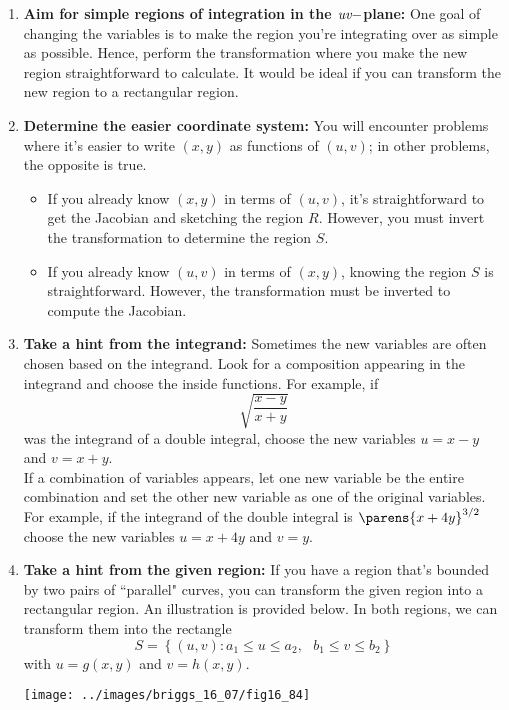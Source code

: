 \documentclass[../mathNotesPreamble]{subfiles}
\begin{document}
\begin{enumerate}
\item\textbf{Aim for simple regions of integration in the $\emph{uv}-$plane:} One goal of changing the variables is to make the region you're integrating over as simple as possible. Hence, perform the transformation where  you make the new region straightforward to calculate. It would be ideal if you can transform the new region to a rectangular region.

\item\textbf{Determine the easier coordinate system:} You will encounter problems where it's easier to write $(x,y)$ as functions of $(u,v)$; in other problems, the opposite is true. 
\begin{itemize}
\item If you already know $(x,y)$ in terms of $(u,v)$, it's straightforward to get the Jacobian and sketching the region $R$. However, you must invert the transformation to determine the region $S$.

\item  If you already know $(u,v)$ in terms of $(x,y)$, knowing the region $S$ is straightforward. However, the transformation must be inverted to compute the Jacobian.
\end{itemize} 
\item\textbf{Take a hint from the integrand:} Sometimes the new variables are often chosen based on the integrand. Look for a composition appearing in the integrand and choose the inside functions. For example, if
\[
\sqrt{\dfrac{x-y}{x+y}}
\]
was the integrand of a double integral, choose the new variables $u=x-y$ and $v=x+y$.\\

If a combination of variables appears, let one new variable be the entire combination and set the other new variable as one of the original variables. For example, if the integrand of the double integral is $
\parens{x+4y}^{3/2}$
choose the new variables $u=x+4y$ and $v=y$.

\item\textbf{Take a hint from the given  region:} If you have a region that's bounded by two pairs of ``parallel" curves, you can transform the given region into a rectangular region. An illustration is provided below. In both regions, we can  transform them into the rectangle 
\[
S=\left\{(u,v):a_1\leq u\leq a_2,\text{ }b_1\leq v\leq b_2\right\}
\]
with $u=g(x,y)$ and $v=h(x,y).$
\begin{center}
\texttt{[image: ../images/briggs\_16\_07/fig16\_84]}
\end{center}
\end{enumerate}
  \pagebreak
\end{document}
